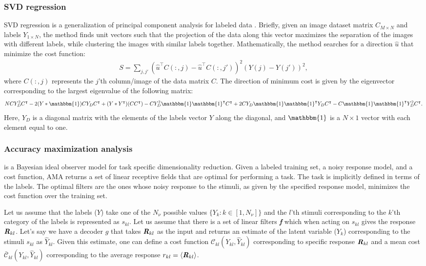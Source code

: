 \documentclass{jov}
\begin{document}
\subsubsection*{SVD regression}
SVD regression is a generalization of principal component analysis for labeled data \cite{ranganNotes}. Briefly, given an image dataset matrix $C_{M \times N}$ and labels $Y_{1\times N}$, the method finds unit vectors such that the projection of the data along this vector maximizes the separation of the images with different labels, while clustering the images with similar labels together. Mathematically, the method searches for a direction $\hat{u}$ that minimize the cost function:
\begin{align}
S = \sum\limits_{j,j'}\left(\hat{u}^\intercal C(:,j) - \hat{u}^\intercal C(:,j')\right)^2 \left(Y(j)-Y(j') \right)^2,
\end{align} 
where $C(:,j)$ represents the $j$'th column/image of the data matrix $C$. The direction of minimum cost is given by the eigenvector corresponding to the largest eigenvalue of the following matrix:
\begin{align}
N C Y_D^2 C^\intercal - 2(Y*\mathbbm{1})C Y_D C^\intercal + (Y*Y^\intercal) (CC^\intercal)-C Y_{D}^2\mathbbm{1}\mathbbm{1}^\intercal C^\intercal +2 C Y_{D} \mathbbm{1}\mathbbm{1}^\intercal Y_{D} C^\intercal - C \mathbbm{1}\mathbbm{1}^\intercal Y_{D}^2 C^\intercal.
\end{align}
Here, $Y_{D}$ is a diagonal matrix with the elements of the labels vector $Y$ along the diagonal, and $\mathbbm{1}$ is a $N\times 1$ vector with each element equal to one.

\subsubsection*{Accuracy maximization analysis}
 \cite{geisler2009optimal,burge2017accuracy} is a Bayesian ideal observer model for task specific dimensionality reduction. Given a labeled training set, a noisy response model, and a cost function, AMA returns a set of linear receptive fields that are optimal for performing a task. The task is implicitly defined in terms of the labels. The optimal filters are the ones whose noisy response to the stimuli, as given by the specified response model, minimizes the cost function over the training set. 

Let us assume that the labels ($Y$) take one of the $N_{\nu}$ possible values $\{Y_k: k\in[1,N_{\nu}] \}$ and the $l$'th stimuli corresponding to the $k$'th category of the labels is represented as $s_{kl}$. Let us assume that there is a set of linear filters {\textbf{\textit f}} which when acting on $s_{kl}$ gives the response ${\textbf{\textit R}}_{kl}$. Let's say we have a decoder $g$ that takes ${\textbf{\textit R}}_{kl}$ as the input and returns an estimate of the latent variable ($Y_k$) corresponding to the stimuli $s_{kl}$ as $\hat{Y}_{kl}$. Given this estimate, one can define a cost function $\mathcal{C}_{kl}(Y_{kl},\hat{Y}_{kl})$ corresponding to specific response ${\textbf{\textit R}}_{kl}$ and a mean cost $\bar{\mathcal{C}}_{kl}(Y_{kl},\hat{Y}_{kl})$ corresponding to the average response $r_{kl} = \langle{\textbf{\textit R}}_{kl}\rangle$. 
\end{document}
